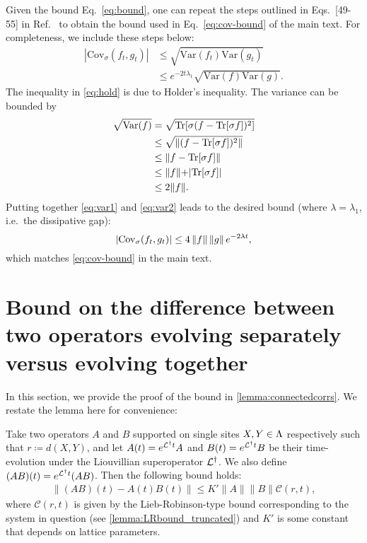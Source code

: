 Given the bound Eq.~\eqref{eq:bound}, one can repeat the steps outlined in Eqs.~[49-55] in Ref.~\cite{Kastoryano2013} to obtain the bound used in Eq.~\eqref{eq:cov-bound} of the main text. For completeness, we include these steps below:
\begin{align}
|\text{Cov}_\sigma (f_t, g_t)| & \leq \sqrt{ \text{Var}(f_t) \text{Var}(g_t)  }  \label{eq:hold} \\
& \leq e^{-2 t \lambda_1} \sqrt{ \text{Var}(f) \text{Var}(g)  }  \label{eq:var1}.
\end{align}
The inequality in \eqref{eq:hold} is due to  Holder's inequality. The variance can be bounded by
\begin{align}
\sqrt{\text{Var}(f)} &= \sqrt{\mathrm{Tr}[ \sigma(f - \mathrm{Tr}[ \sigma f])^2 ] }  \\
& \leq \sqrt{ \lVert (f - \mathrm{Tr}[ \sigma f])^2 \lVert } \\
& \leq \lVert f - \mathrm{Tr}[ \sigma f] \lVert\\
& \leq \lVert f  \lVert + | \mathrm{Tr}[\sigma f]| \\
& \leq 2 \lVert f \lVert  \label{eq:var2}.
\end{align}
Putting together \eqref{eq:var1} and \eqref{eq:var2} leads to the desired bound (where $\lambda = \lambda_1$, i.e.~the dissipative gap):
\begin{equation}
|\text{Cov}_\sigma (f_t, g_t)| \leq 4 \left\|f\right\| \left\|g\right\|  e^{-2 \lambda t},
\end{equation}
which matches \cref{eq:cov-bound} in the main text.

\section{Bound on the difference between two operators evolving separately versus evolving together}
\setcounter{lemma}{1}
\label{app:connectedcorrs}
In this section, we provide the proof of the bound in \cref{lemma:connectedcorrs}. We restate the lemma here for convenience:
\begin{lemma}
  \label{lemma:connectedcorrs2}
    Take two operators $A$ and $B$ supported on single sites $X,Y \in \Lambda$  respectively such that $r\coloneqq d(X,Y)$, and let $A(t)=e^{\mathcal{L}^\dag t}A$ and $B(t) = e^{\mathcal{L}^\dag t}B$ be their time-evolution under the Liouvillian superoperator $\mathcal{L}^\dag$.
    We also define $(AB)(t) = e^{\mathcal{L}^\dag t}(AB)$.
    Then the following bound holds:
    \begin{align}
        \|(AB)(t) - A(t)B(t)\| \le K'\|A\|\|B\| \mathcal C(r,t),
    \end{align}
    where $\mathcal C(r,t)$ is given by the Lieb-Robinson-type bound corresponding to the system in question (see \cref{lemma:LRbound_truncated}) and $K'$ is some constant that depends on lattice parameters.
\end{lemma}

